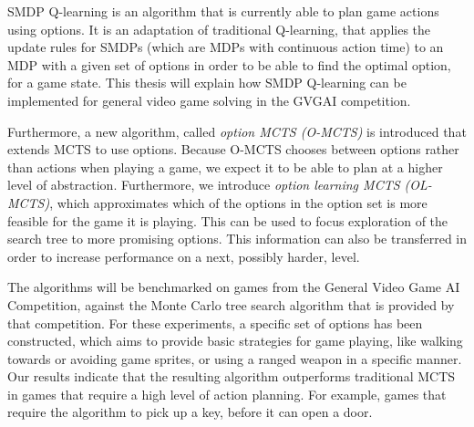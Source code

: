 SMDP Q-learning is an algorithm that is currently able to plan game actions
using options. It is an adaptation of traditional Q-learning, that applies the
update rules for SMDPs (which are MDPs with continuous action time) to an MDP
with a given set of options in order to be able to find the optimal option,
for a game state. This thesis will explain how SMDP Q-learning can be
implemented for general video game solving in the GVGAI competition.

Furthermore, a new algorithm, called \emph{option MCTS (O-MCTS)} is introduced
that extends MCTS to use options. Because O-MCTS chooses between options rather
than actions when playing a game, we expect it to be able to plan at a higher
level of abstraction. Furthermore, we introduce \emph{option learning MCTS
(OL-MCTS)}, which approximates which of the options in the option set is more
feasible for the game it is playing. This can be used to focus exploration of
the search tree to more promising options. This information can also be
transferred in order to increase performance on a next, possibly harder, level. 

The algorithms will be benchmarked on games from the General Video Game AI
Competition, against the Monte Carlo tree search algorithm that is
provided by that competition. For these experiments, a specific set of options
has been constructed, which aims to provide basic strategies for game playing,
like walking towards or avoiding game sprites, or using a ranged weapon in a
specific manner. Our results indicate that the resulting algorithm outperforms
traditional MCTS in games that require a high level of action planning. For
example, games that require the algorithm to pick up a key, before it can open a
door. 
